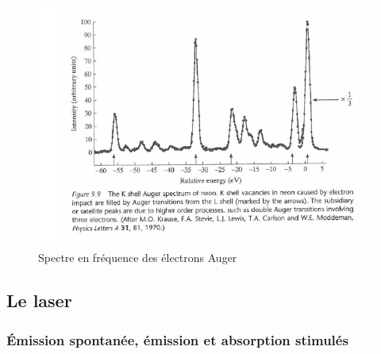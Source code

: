 \begin{figure}[htp]
    \centering
    \includegraphics[scale=1.0]{Images2/Spectre Auger.PNG}
    \caption{Spectre en fréquence des électrons Auger}
    \label{fig:SpectreAuger}
\end{figure}








\subsection{Le laser}

\subsubsection{Émission spontanée, émission et absorption stimulés}





